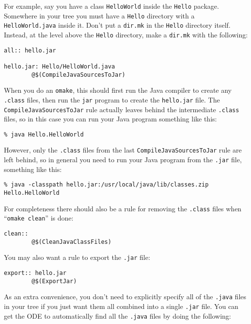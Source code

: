 \documentclass[11pt,twoside,onecolumn]{article}
\begin{document}
For example, say you have a class \verb|HelloWorld| inside the \verb|Hello|
package.  Somewhere in your tree you must have a \verb|Hello| directory with
a \verb|HelloWorld.java| inside it.  Don't put a {\tt dir.mk} in the
\verb|Hello| directory itself.  Instead, at the level above the \verb|Hello|
directory, make a {\tt dir.mk} with the following:

{\footnotesize \begin{verbatim}
all:: hello.jar

hello.jar: Hello/HelloWorld.java
        @$(CompileJavaSourcesToJar)
\end{verbatim}}

When you do an \verb|omake|, this should first run the Java compiler to create
any \verb|.class| files, then run the \verb|jar| program to create the
\verb|hello.jar| file.  The \verb|CompileJavaSourcesToJar| rule actually leaves
behind the intermediate \verb|.class| files, so in this case you can run your
Java program something like this:

{\footnotesize \begin{verbatim}
% java Hello.HelloWorld
\end{verbatim}}

However, only the \verb|.class| files from the last
\verb|CompileJavaSourcesToJar| rule are left behind, so in general you need to
run your Java program from the \verb|.jar| file, something like this:

{\footnotesize \begin{verbatim}
% java -classpath hello.jar:/usr/local/java/lib/classes.zip Hello.HelloWorld
\end{verbatim}}

For completeness there should also be a rule for removing the \verb|.class|
files when ``{\tt omake clean}'' is done:

{\footnotesize \begin{verbatim}
clean::
        @$(CleanJavaClassFiles)
\end{verbatim}}

You may also want a rule to export the \verb|.jar| file:

{\footnotesize \begin{verbatim}
export:: hello.jar
        @$(ExportJar)
\end{verbatim}}

As an extra convenience, you don't need to explicitly specify all of the
\verb|.java| files in your tree if you just want them all combined into a
single \verb|.jar| file.  You can get the ODE to automatically find all the
\verb|.java| files by doing the following:
\end{document}
